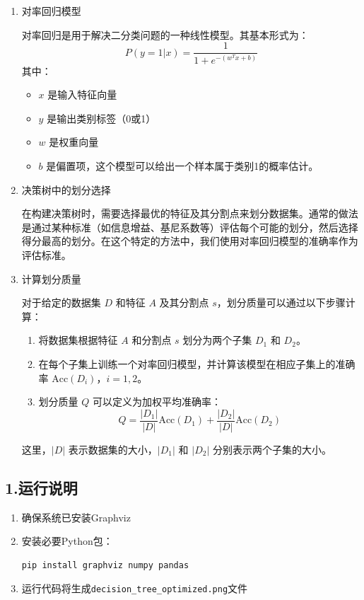 \begin{enumerate}
\item 对率回归模型

对率回归是用于解决二分类问题的一种线性模型。其基本形式为：
\[
P(y=1|x) = \frac{1}{1 + e^{-(w^Tx+b)}}
\]
其中：
\begin{itemize}
  \item $x$ 是输入特征向量
  \item $y$ 是输出类别标签（0或1）
  \item $w$ 是权重向量
  \item $b$ 是偏置项，这个模型可以给出一个样本属于类别1的概率估计。
\end{itemize}   


\item 决策树中的划分选择

在构建决策树时，需要选择最优的特征及其分割点来划分数据集。通常的做法是通过某种标准（如信息增益、基尼系数等）评估每个可能的划分，然后选择得分最高的划分。在这个特定的方法中，我们使用对率回归模型的准确率作为评估标准。

\item 计算划分质量

对于给定的数据集 $D$ 和特征 $A$ 及其分割点 $s$，划分质量可以通过以下步骤计算：
\begin{enumerate}
    \item 将数据集根据特征 $A$ 和分割点 $s$ 划分为两个子集 $D_1$ 和 $D_2$。
    \item 在每个子集上训练一个对率回归模型，并计算该模型在相应子集上的准确率 $\text{Acc}(D_i)$，$i=1,2$。
    \item 划分质量 $Q$ 可以定义为加权平均准确率：
    \[
    Q = \frac{|D_1|}{|D|} \text{Acc}(D_1) + \frac{|D_2|}{|D|} \text{Acc}(D_2)
    \]
\end{enumerate}
这里，$ |D| $ 表示数据集的大小，$ |D_1| $ 和 $ |D_2| $ 分别表示两个子集的大小。

\end{enumerate}

\subsection*{1.运行说明}

\begin{enumerate}
    \item 确保系统已安装Graphviz
    \item 安装必要Python包：
    \begin{verbatim}
pip install graphviz numpy pandas
    \end{verbatim}
    \item 运行代码将生成\texttt{decision\_tree\_optimized.png}文件
\end{enumerate}

